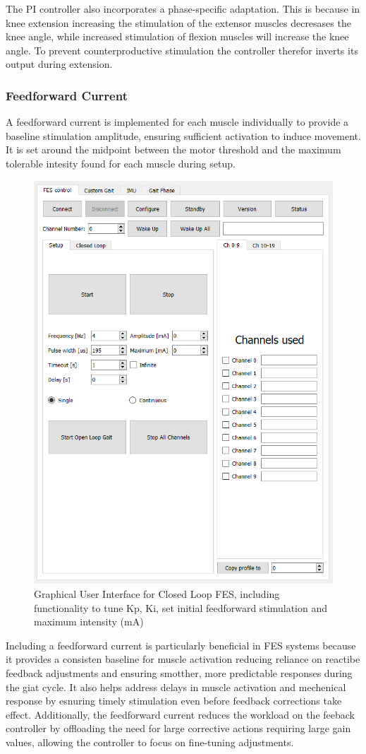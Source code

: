 The PI controller also incorporates a phase-specific adaptation. This is because in knee extension increasing the stimulation of the extensor muscles decresases the knee angle, while increased stimulation of flexion muscles will increase the knee angle. To prevent counterproductive stimulation the controller therefor inverts its output during extension.


\subsubsection{Feedforward Current}
A feedforward current is implemented for each muscle individually to provide a baseline stimulation amplitude, ensuring sufficient activation to induce movement. It is set around the midpoint between the motor threshold and the maximum tolerable intesity found for each muscle during setup. 

\begin{figure}
    \centering
    \includegraphics[width=0.65\linewidth]{images/clgui.png}
    \caption{Graphical User Interface for Closed Loop FES, including functionality to tune Kp, Ki, set initial feedforward stimulation and maximum intensity (mA)}
    \label{fig:clsetup}
\end{figure}

Including a feedforward current is particularly beneficial in FES systems because it provides a consisten baseline for muscle activation reducing reliance on reactibe feedback adjustments and ensuring smotther, more predictable responses during the giat cycle. It also helps address delays in muscle activation and mechenical response by esnuring timely stimulation even before feedback corrections take effect. Additionally, the feedforward current reduces the workload on the feeback controller by offloading the need for large corrective actions requiring large gain values, allowing the controller to focus on fine-tuning adjustments.

